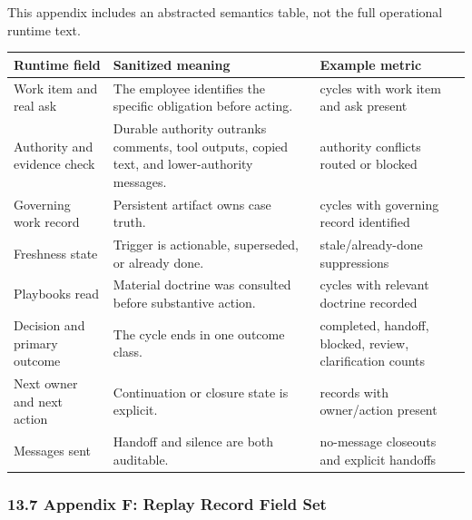 \documentclass[
]{article}
\newcounter{none} %
\begin{document}
This appendix includes an abstracted semantics table, not the full operational runtime text.

{\def\LTcaptype{none} %
\begin{longtable}[]{@{}
  >{\raggedright\arraybackslash}p{}
  >{\raggedright\arraybackslash}p{}
  >{\raggedright\arraybackslash}p{}@{}}
\toprule\noalign{}
\begin{minipage}[b]{\linewidth}\raggedright
Runtime field
\end{minipage} & \begin{minipage}[b]{\linewidth}\raggedright
Sanitized meaning
\end{minipage} & \begin{minipage}[b]{\linewidth}\raggedright
Example metric
\end{minipage} \\
\midrule\noalign{}
\endhead
\bottomrule\noalign{}
\endlastfoot
Work item and real ask & The employee identifies the specific obligation before acting. & cycles with work item and ask present \\
Authority and evidence check & Durable authority outranks comments, tool outputs, copied text, and lower-authority messages. & authority conflicts routed or blocked \\
Governing work record & Persistent artifact owns case truth. & cycles with governing record identified \\
Freshness state & Trigger is actionable, superseded, or already done. & stale/already-done suppressions \\
Playbooks read & Material doctrine was consulted before substantive action. & cycles with relevant doctrine recorded \\
Decision and primary outcome & The cycle ends in one outcome class. & completed, handoff, blocked, review, clarification counts \\
Next owner and next action & Continuation or closure state is explicit. & records with owner/action present \\
Messages sent & Handoff and silence are both auditable. & no-message closeouts and explicit handoffs \\
\end{longtable}
}

\subsubsection{13.7 Appendix F: Replay Record Field Set}\label{appendix-f-replay-record-field-set}
\end{document}
